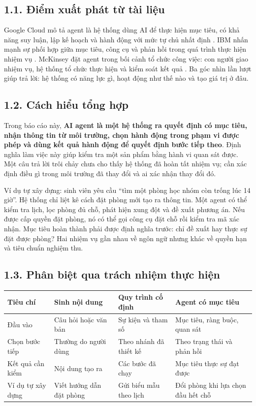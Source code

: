 \documentclass[11pt,a4paper]{article}
\begin{document}
\subsection{1.1. Điểm xuất phát từ tài liệu}
Google Cloud mô tả agent là hệ thống dùng AI để thực hiện mục tiêu, có khả năng suy luận,
lập kế hoạch và hành động với mức tự chủ nhất định \cite{google}.
IBM nhấn mạnh sự phối hợp giữa mục tiêu, công cụ và phản hồi trong quá trình thực hiện
nhiệm vụ \cite{ibm}. McKinsey đặt agent trong bối cảnh tổ chức công việc: con người giao
nhiệm vụ, hệ thống tổ chức thực hiện và kiểm soát kết quả \cite{mckinsey}.
Ba góc nhìn lần lượt giúp trả lời: hệ thống có năng lực gì, hoạt động như thế nào và tạo
giá trị ở đâu.

\subsection{1.2. Cách hiểu tổng hợp}
Trong báo cáo này, \textbf{AI agent là một hệ thống ra quyết định có mục tiêu, nhận thông tin
từ môi trường, chọn hành động trong phạm vi được phép và dùng kết quả hành động để quyết
định bước tiếp theo}. Định nghĩa làm việc này giúp kiểm tra một sản phẩm bằng hành vi
quan sát được. Một câu trả lời trôi chảy chưa cho thấy hệ thống đã hoàn tất nhiệm vụ;
cần xác định điều gì trong môi trường đã thay đổi và ai xác nhận thay đổi đó.

Ví dụ tự xây dựng: sinh viên yêu cầu ``tìm một phòng học nhóm còn trống lúc 14 giờ''.
Hệ thống chỉ liệt kê cách đặt phòng mới tạo ra thông tin. Một agent có thể kiểm tra lịch,
lọc phòng đủ chỗ, phát hiện xung đột và đề xuất phương án. Nếu được cấp quyền đặt phòng,
nó có thể gọi công cụ đặt chỗ rồi kiểm tra mã xác nhận. Mục tiêu hoàn thành phải được
định nghĩa trước: chỉ đề xuất hay thực sự đặt được phòng? Hai nhiệm vụ gần nhau về ngôn
ngữ nhưng khác về quyền hạn và tiêu chuẩn nghiệm thu.

\subsection{1.3. Phân biệt qua trách nhiệm thực hiện}
\begin{center}\small
\begin{tabularx}{\linewidth}{@{}p{2.8cm}XXX@{}}
\toprule
\textbf{Tiêu chí} & \textbf{Sinh nội dung} & \textbf{Quy trình cố định} & \textbf{Agent có mục tiêu}\\
\midrule
Đầu vào & Câu hỏi hoặc văn bản & Sự kiện và tham số & Mục tiêu, ràng buộc, quan sát\\
Chọn bước tiếp & Thường do người dùng & Theo nhánh đã thiết kế & Theo trạng thái và phản hồi\\
Kết quả cần kiểm & Nội dung tạo ra & Các bước đã chạy & Mục tiêu thực sự đạt được\\
Ví dụ tự xây dựng & Viết hướng dẫn đặt phòng & Gửi biểu mẫu theo lịch & Đổi phòng khi lựa chọn đầu hết chỗ\\
\bottomrule
\end{tabularx}
\end{center}
\end{document}

